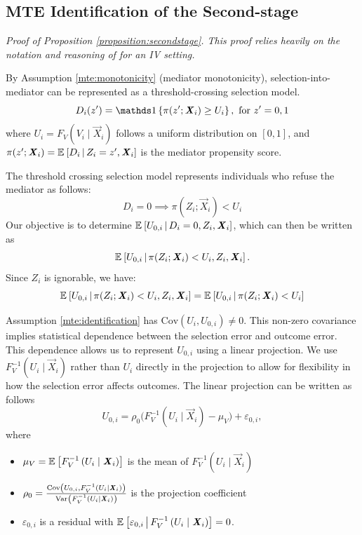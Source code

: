 \subsection{MTE Identification of the Second-stage}
\label{appendix:mte-secondstage}
\textit{Proof of Proposition \ref{proposition:secondstage}.
    This proof relies heavily on the notation and reasoning of \cite{kline2019heckits} for an IV setting.}

By Assumption \ref{mte:monotonicity} (mediator monotonicity), selection-into-mediator can be represented as a threshold-crossing selection model.
\[ D_i(z') = \indicator{ \pi(z'; \vec X_i) \geq U_i }, \text{ for } z' = 0, 1 \]
where $U_i = F_V\left( V_i \mid \vec{X}_i \right)$ follows a uniform distribution on $[0,1]$, and $\pi(z'; \boldsymbol{\mathit{X}}_i) = \mathbb{E}_{} \left[ D_i \, \middle\vert \, Z_i = z', \boldsymbol{\mathit{X}}_i \right]$ is the mediator propensity score.

The threshold crossing selection model represents individuals who refuse the mediator as follows:
\[ D_i = 0 \implies \pi(Z_i; \vec X_i) < U_i \]
Our objective is to determine $\mathbb{E}_{} \left[ U_{0,i} \, \middle\vert \, D_i=0, Z_i, \boldsymbol{\mathit{X}}_i \right]$, which can then be written as
\[ \mathbb{E}_{} \left[ U_{0,i} \, \middle\vert \, \pi(Z_i; \boldsymbol{\mathit{X}}_i) < U_i, Z_i, \boldsymbol{\mathit{X}}_i \right]. \]
Since $Z_i$ is ignorable, we have:
\[ \mathbb{E}_{} \left[ U_{0,i} \, \middle\vert \, \pi(Z_i; \boldsymbol{\mathit{X}}_i) < U_i, Z_i, \boldsymbol{\mathit{X}}_i \right]
    = \mathbb{E}_{} \left[ U_{0,i} \, \middle\vert \, \pi(Z_i; \boldsymbol{\mathit{X}}_i) < U_i \right] \]

Assumption \ref{mte:identification} has $\text{Cov}(U_i, U_{0,i}) \neq 0$.
This non-zero covariance implies statistical dependence between the selection error and outcome error.
This dependence allows us to represent $U_{0,i}$ using a linear projection.
We use $F_V^{-1}\left( U_i \mid \vec{X}_i \right)$ rather than $U_i$ directly in the projection to allow for flexibility in how the selection error affects outcomes.
The linear projection can be written as follows
\[ U_{0,i} = \rho_0 \big( F_V^{-1}\left( U_i \mid \vec{X}_i \right) - \mu_V \big) + \varepsilon_{0,i}, \]
where
\begin{itemize}
    \item $\mu_V = \mathbb{E}_{} \left[ F_V^{-1}\left( U_i \mid \boldsymbol{\mathit{X}}_i \right) \right]$ is the mean of $F_V^{-1}\left( U_i \mid \vec{X}_i \right)$
    \item $\rho_0 = \frac{\text{Cov} \left( U_{0,i}, F_V^{-1}\left( U_i \mid \boldsymbol{\mathit{X}}_i \right) \right)}{\text{Var}_{} \left( F_V^{-1}\left( U_i \mid \boldsymbol{\mathit{X}}_i \right) \right)}$ is the projection coefficient
    \item $\varepsilon_{0,i}$ is a residual with $\mathbb{E}_{} \left[ \varepsilon_{0,i} \, \middle\vert \, F_V^{-1}\left( U_i \mid \boldsymbol{\mathit{X}}_i \right) \right] = 0$.
\end{itemize}

